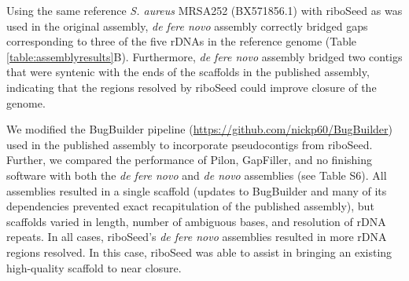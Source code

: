 \documentclass[a4,center,fleqn]{NAR}
\begin{document}

Using the same reference \textit{S. aureus} MRSA252 \cite{Holden2004} (BX571856.1) with riboSeed as was used in the original assembly, \textit{de fere novo} assembly correctly bridged gaps corresponding to three of the five rDNAs in the reference genome (Table \ref{table:assemblyresults}B). Furthermore, \textit{de fere novo} assembly bridged two contigs that were syntenic with the ends of the scaffolds in the published assembly, indicating that the regions resolved by riboSeed could improve closure of the genome.

We modified the BugBuilder pipeline (\url{https://github.com/nickp60/BugBuilder}) used in the published assembly to incorporate pseudocontigs from riboSeed. Further, we compared the performance of Pilon, GapFiller, and no finishing software with both the \textit{de fere novo} and \textit{de novo} assemblies (see Table S6). All assemblies resulted in a single scaffold (updates to BugBuilder and many of its dependencies prevented exact recapitulation of the published assembly), but scaffolds varied in length, number of ambiguous bases, and resolution of rDNA repeats. In all cases, riboSeed's \textit{de fere novo} assemblies resulted in more rDNA regions resolved. In this case, riboSeed was able to assist in bringing an existing high-quality scaffold to near closure.
\end{document}
